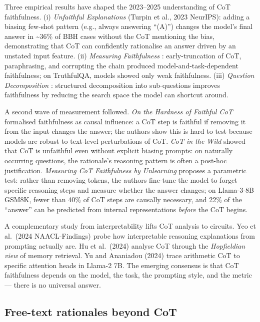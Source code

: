 \documentclass{article}
\begin{document}
Three empirical results have shaped the 2023--2025 understanding of CoT faithfulness. (i) \emph{Unfaithful Explanations} (Turpin et al., 2023 NeurIPS): adding a biasing few-shot pattern (e.g., always answering ``(A)'') changes the model's final answer in \textasciitilde36\% of BBH cases without the CoT mentioning the bias, demonstrating that CoT can confidently rationalise an answer driven by an unstated input feature. (ii) \emph{Measuring Faithfulness} \citep{lanham2023measuringfaithfuln}: early-truncation of CoT, paraphrasing, and corrupting the chain produced model-and-task-dependent faithfulness; on TruthfulQA, models showed only weak faithfulness. (iii) \emph{Question Decomposition} \citep{radhakrishnan2023questiondecomposit}: structured decomposition into sub-questions improves faithfulness by reducing the search space the model can shortcut around.

A second wave of measurement followed. \emph{On the Hardness of Faithful CoT} \citep{tanneru2024onthehardnessoffai} formalised faithfulness as causal influence: a CoT step is faithful if removing it from the input changes the answer; the authors show this is hard to test because models are robust to text-level perturbations of CoT. \emph{CoT in the Wild} \citep{arcuschin2025chainofthoughtreas} showed that CoT is unfaithful even without explicit biasing prompts: on naturally occurring questions, the rationale's reasoning pattern is often a post-hoc justification. \emph{Measuring CoT Faithfulness by Unlearning} \citep{tutek2025measuringchainofth} proposes a parametric test: rather than removing tokens, the authors fine-tune the model to forget specific reasoning steps and measure whether the answer changes; on Llama-3-8B GSM8K, fewer than 40\% of CoT steps are causally necessary, and 22\% of the ``answer'' can be predicted from internal representations \emph{before} the CoT begins.

A complementary study from interpretability lifts CoT analysis to circuits. Yeo et al.~(2024 NAACL-Findings) probe how interpretable reasoning explanations from prompting actually are. Hu et al.~(2024) analyse CoT through the \emph{Hopfieldian view} of memory retrieval. Yu and Ananiadou (2024) trace arithmetic CoT to specific attention heads in Llama-2 7B. The emerging consensus is that CoT faithfulness depends on the model, the task, the prompting style, and the metric --- there is no universal answer.

\subsection{Free-text rationales beyond CoT}\label{free-text-rationales-beyond-cot}
\end{document}
